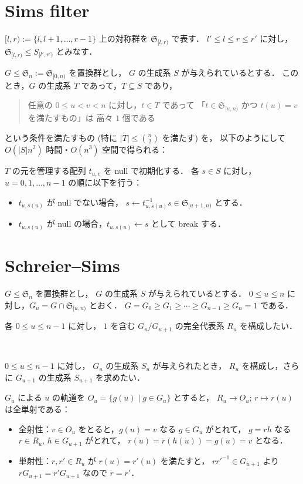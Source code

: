 \documentclass{jsarticle}
\newcommand{\abs}[1]{\lvert #1 \rvert}
\renewcommand{\S}{\mathfrak{S}}
\begin{document}
\section{Sims filter}
$[l, r) := \{l, l+1, \ldots, r-1\}$ 上の対称群を $\S_{[l,r)}$ で表す．
$l' \le l \le r \le r'$ に対し，$\S_{[l,r)} \le S_{[l',r')}$ とみなす．

$G \le \S_n := \S_{[0,n)}$ を置換群とし，
$G$ の生成系 $S$ が与えられているとする．
このとき，$G$ の生成系 $T$ であって，$T \subseteq S$ であり，
\begin{quote}
任意の $0 \le u < v < n$ に対し，$t \in T$ であって
「$t \in \S_{[u,n)}$ かつ $t(u) = v$ を満たすもの」は
高々 $1$ 個である
\end{quote}
という条件を満たすもの (特に $\abs{T} \le \binom{n}{2}$ を満たす) を，
以下のようにして $O(\abs{S} n^2)$ 時間・$O(n^3)$ 空間で得られる：

$T$ の元を管理する配列 $t_{u,v}$ を null で初期化する．
各 $s \in S$ に対し，$u = 0, 1, \ldots, n-1$ の順に以下を行う：
\begin{itemize}
  \item $t_{u,s(u)}$ が null でない場合，
    $s \gets t_{u,s(u)}^{-1} s \in \S_{[u+1,n)}$ とする．
  \item $t_{u,s(u)}$ が null の場合，$t_{u,s(u)} \gets s$ として break する．
\end{itemize}


\section{Schreier--Sims}
$G \le \S_n$ を置換群とし，
$G$ の生成系 $S$ が与えられているとする．
$0 \le u \le n$ に対し，$G_u = G \cap \S_{[u,n)}$ とおく．
$G = G_0 \ge G_1 \ge \cdots \ge G_{n-1} \ge G_n = 1$ である．

各 $0 \le u \le n-1$ に対し，
$1$ を含む $G_u/G_{u+1}$ の完全代表系 $R_u$ を構成したい．

\

$0 \le u \le n-1$ に対し，
$G_u$ の生成系 $S_u$ が与えられたとき，
$R_u$ を構成し，さらに $G_{u+1}$ の生成系 $S_{u+1}$ を求めたい．

$G_u$ による $u$ の軌道を $O_u = \{ g(u) \mid g \in G_u \}$ とすると，
$R_u \to O_u;\, r \mapsto r(u)$ は全単射である：
\begin{itemize}
  \item 全射性：$v \in O_u$ をとると，$g(u) = v$ なる $g \in G_u$ がとれて，
      $g = rh$ なる $r \in R_u$, $h \in G_{u+1}$ がとれて，
      $r(u) = r(h(u)) = g(u) = v$ となる．
  \item 単射性：$r, r' \in R_u$ が $r(u) = r'(u)$ を満たすと，
      $rr'^{-1} \in G_{u+1}$ より $r G_{u+1} = r' G_{u+1}$ なので $r = r'$．
\end{itemize}
\end{document}
